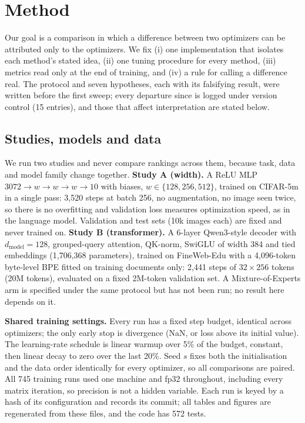 \section{Method}
\label{sec:method}

Our goal is a comparison in which a difference between two optimizers can be attributed only to
the optimizers. We fix (i) one implementation that isolates each method's stated idea, (ii) one
tuning procedure for every method, (iii) metrics read only at the end of training, and (iv) a
rule for calling a difference real. The protocol and seven hypotheses, each with its falsifying
result, were written before the first sweep; every departure since is logged under version
control (15 entries), and those that affect interpretation are stated below.

\subsection{Studies, models and data}

We run two studies and never compare rankings across them, because task, data and model family
change together. \textbf{Study A (width).} A ReLU MLP $3072\!\to\!w\!\to\!w\!\to\!w\!\to\!10$ with
biases, $w\in\{128,256,512\}$, trained on CIFAR-5m \citep{nakkiran2021bootstrap} in a single
pass: 3{,}520 steps at batch 256, no augmentation, no image seen twice, so there is no
overfitting and validation loss measures optimization speed, as in the language model.
Validation and test sets (10k images each) are fixed and never trained on. \textbf{Study B (transformer).} A 6-layer Qwen3-style decoder
\citep{yang2025qwen3} with $d_{\text{model}}=128$, grouped-query attention, QK-norm, SwiGLU of
width 384 and tied embeddings (1{,}706{,}368 parameters), trained on FineWeb-Edu
\citep{penedo2024fineweb} with a 4{,}096-token byte-level BPE fitted on training documents
only: 2{,}441 steps of $32\times256$ tokens (20M tokens), evaluated on a fixed 2M-token
validation set. A Mixture-of-Experts arm is specified under the same protocol but has not been
run; no result here depends on it.

\textbf{Shared training settings.} Every run has a fixed step budget, identical across
optimizers; the only early stop is divergence (NaN, or loss above its initial value). The
learning-rate schedule is linear warmup over 5\% of the budget, constant, then linear decay to
zero over the last 20\%. Seed $s$ fixes both the initialisation and the data order identically
for every optimizer, so all comparisons are paired. All 745 training runs used one machine and
fp32 throughout, including every matrix iteration, so precision is not a hidden variable. Each
run is keyed by a hash of its configuration and records its commit; all tables and figures are
regenerated from these files, and the code has 572 tests.

